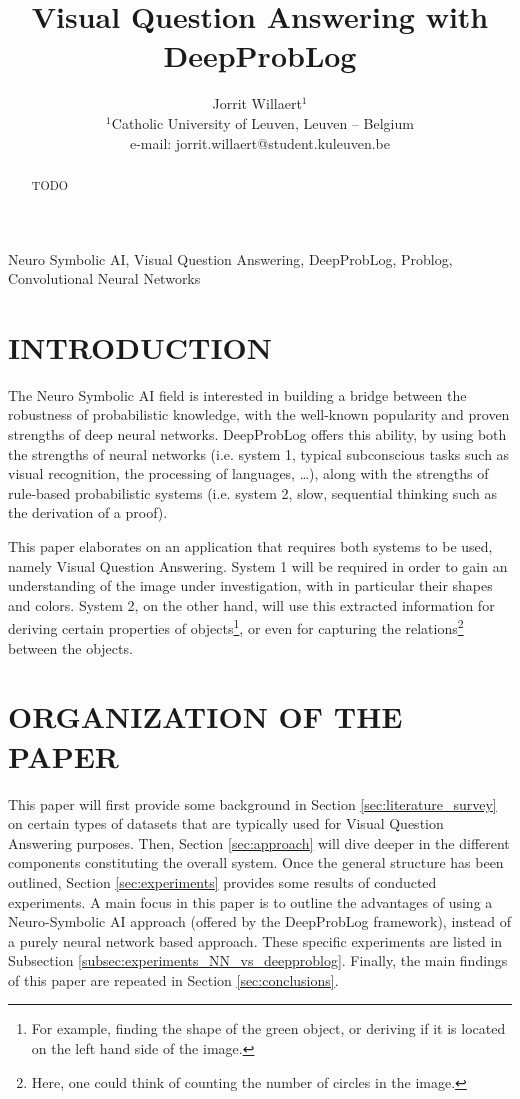 \documentclass[english]{sobraep}
\title{Visual Question Answering with DeepProbLog}
\author{Jorrit Willaert$^{1}$ \\
	\normalsize $^{1}$Catholic University of Leuven, Leuven -- Belgium \\
	\normalsize e-mail: jorrit.willaert@student.kuleuven.be
}
\begin{document}
\maketitle

\begin{abstract}
	TODO
\end{abstract}

\begin{keywords}
	Neuro Symbolic AI, Visual Question Answering, DeepProbLog, Problog, Convolutional Neural Networks
\end{keywords}

\section{INTRODUCTION}
The Neuro Symbolic AI field is interested in building a bridge between the robustness of probabilistic knowledge, with the well-known popularity and proven strengths of deep neural networks. DeepProbLog \cite{deepproblog} offers this ability, by using both the strengths of neural networks (i.e. system 1, typical subconscious tasks such as visual recognition, the processing of languages, \dots), along with the strengths of rule-based probabilistic systems (i.e. system 2, slow, sequential thinking such as the derivation of a proof). 

This paper elaborates on an application that requires both systems to be used, namely Visual Question Answering. System 1 will be required in order to gain an understanding of the image under investigation, with in particular their shapes and colors. System 2, on the other hand, will use this extracted information for deriving certain properties of objects\footnote{For example, finding the shape of the green object, or deriving if it is located on the left hand side of the image.}, or even for capturing the relations\footnote{Here, one could think of counting the number of circles in the image.} between the objects. 

\section{ORGANIZATION OF THE PAPER}
This paper will first provide some background in Section \ref{sec:literature_survey} on certain types of datasets that are typically used for Visual Question Answering purposes. %
Then, Section \ref{sec:approach} will dive deeper in the different components constituting the overall system. Once the general structure has been outlined, Section \ref{sec:experiments} provides some results of conducted experiments. A main focus in this paper is to outline the advantages of using a Neuro-Symbolic AI approach (offered by the DeepProbLog framework), instead of a purely neural network based approach. These specific experiments are listed in Subsection \ref{subsec:experiments_NN_vs_deepproblog}. Finally, the main findings of this paper are repeated in Section \ref{sec:conclusions}.
\end{document}
